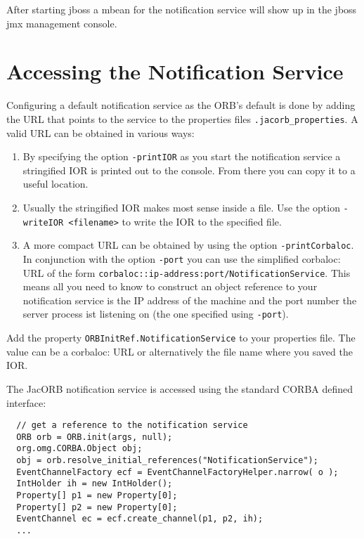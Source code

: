 After starting jboss a mbean for the notification service will show up in
the jboss jmx management console.

\section{Accessing the Notification Service}
\label{sec:access-notif-serv}

Configuring a default notification service as the ORB's default is done
by adding the URL that points to the service to the properties files
\texttt{.jacorb\_properties}. A valid URL can be obtained in various ways:
\begin{enumerate}
\item By specifying the option \texttt{-printIOR} as you start the
  notification service a stringified IOR is printed out to the
  console. From there you can copy it to a useful location.

\item Usually the stringified IOR makes most sense inside a file. Use
  the option \texttt{-writeIOR <filename>} to write the IOR to the specified
  file.

\item A more compact URL can be obtained by using the
  option \texttt{-printCorbaloc}. In conjunction with the option
  \texttt{-port} you can use the simplified corbaloc: URL of the form
  \texttt{corbaloc::ip-address:port/NotificationService}. This means
  all you need to know to construct an object reference to your
  notification service is the IP address of the machine and the port
  number the server process ist listening on (the one specified using
  \texttt{-port}). 

\end{enumerate}

Add the property \texttt{ORBInitRef.NotificationService} to your
properties file. The value can be a corbaloc: URL or alternatively the
file name where you saved the IOR.

The JacORB notification service is accessed using the standard CORBA
defined interface:

\small{
\begin{verbatim}
  // get a reference to the notification service
  ORB orb = ORB.init(args, null);
  org.omg.CORBA.Object obj; 
  obj = orb.resolve_initial_references("NotificationService");
  EventChannelFactory ecf = EventChannelFactoryHelper.narrow( o );
  IntHolder ih = new IntHolder();
  Property[] p1 = new Property[0];
  Property[] p2 = new Property[0];
  EventChannel ec = ecf.create_channel(p1, p2, ih);
  ...
\end{verbatim}
}

